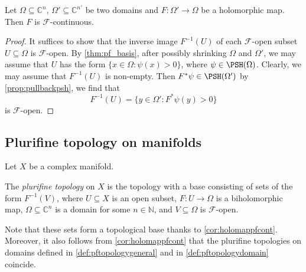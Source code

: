 \begin{corollary}\label{cor:holomappfcont}
    Let $\Omega\subseteq \mathbb{C}^n$, $\Omega'\subseteq \mathbb{C}^{n'}$ be two domains and $F\colon \Omega'\rightarrow \Omega$ be a holomorphic map. Then $F$ is $\mathcal{F}$-continuous.
\end{corollary}

\begin{proof}
    It suffices to show that the inverse image $F^{-1}(U)$ of each $\mathcal{F}$-open subset $U\subseteq \Omega$ is $\mathcal{F}$-open.
    By \cref{thm:pf_basis}, after possibly shrinking $\Omega$ and $\Omega'$, we may assume that $U$ has the form $\{x\in \Omega:\psi(x)>0\}$, where $\psi \in \PSH(\Omega)$. Clearly, we may assume that $F^{-1}(U)$ is non-empty. Then $F^*\psi\in \PSH(\Omega')$ by \cref{prop:pullbackpsh}, we find that
    \[
        F^{-1}(U)=\{y\in \Omega': F^*\psi(y)>0\}
    \]
    is $\mathcal{F}$-open.
\end{proof}


\subsection{Plurifine topology on manifolds}\label{subsec:pftmfd}
Let $X$ be a complex manifold.
\begin{definition}\label{def:pftopologygeneral}
    The \emph{plurifine topology} on $X$ is the topology with a base consisting of sets of the form $F^{-1}(V)$, where $U\subseteq X$ is an open subset, $F\colon U\rightarrow \Omega$ is a biholomorphic map, $\Omega\subseteq \mathbb{C}^n$ is a domain for some $n\in \mathbb{N}$, and $V\subseteq \Omega$ is $\mathcal{F}$-open.
\end{definition}
Note that these sets form a topological base thanks to \cref{cor:holomappfcont}. Moreover, it also follows from \cref{cor:holomappfcont} that the plurifine topologies on domains defined in \cref{def:pftopologygeneral} and in \cref{def:pftopologydomain} coincide.

